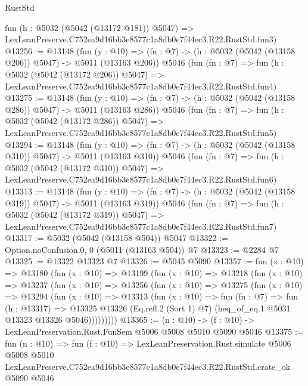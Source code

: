 \begin{lexlean}{RustStd}
\begin{coremodule}
    fun (h : @5032 (@5042 (@13172 @181)) @5047) =>
    LexLeanPreserve.C752ea9d16bb3e8577c1a8db0e7f44ec3.R22.RustStd.fun3)
@13256 := @13148
    (fun (y : @10) => (fn : @7) -> (h : @5032 (@5042 (@13158 @206)) @5047) -> @5011 (@13163 @206))
    @5046
    (fun (fn : @7) =>
    fun (h : @5032 (@5042 (@13172 @206)) @5047) =>
    LexLeanPreserve.C752ea9d16bb3e8577c1a8db0e7f44ec3.R22.RustStd.fun4)
@13275 := @13148
    (fun (y : @10) => (fn : @7) -> (h : @5032 (@5042 (@13158 @286)) @5047) -> @5011 (@13163 @286))
    @5046
    (fun (fn : @7) =>
    fun (h : @5032 (@5042 (@13172 @286)) @5047) =>
    LexLeanPreserve.C752ea9d16bb3e8577c1a8db0e7f44ec3.R22.RustStd.fun5)
@13294 := @13148
    (fun (y : @10) => (fn : @7) -> (h : @5032 (@5042 (@13158 @310)) @5047) -> @5011 (@13163 @310))
    @5046
    (fun (fn : @7) =>
    fun (h : @5032 (@5042 (@13172 @310)) @5047) =>
    LexLeanPreserve.C752ea9d16bb3e8577c1a8db0e7f44ec3.R22.RustStd.fun6)
@13313 := @13148
    (fun (y : @10) => (fn : @7) -> (h : @5032 (@5042 (@13158 @319)) @5047) -> @5011 (@13163 @319))
    @5046
    (fun (fn : @7) =>
    fun (h : @5032 (@5042 (@13172 @319)) @5047) =>
    LexLeanPreserve.C752ea9d16bb3e8577c1a8db0e7f44ec3.R22.RustStd.fun7)
@13317 := @5032 (@5042 (@13158 @504)) @5047
@13322 := Option.noConfusion.{0, 0} (@5011 (@13163 @504)) @7
@13323 := @2284 @7
@13325 := @13322 @13323 @7
@13326 := @5045 @5090
@13357 := fun (x : @10) =>
  @13180
    (fun (x : @10) =>
    @13199
      (fun (x : @10) =>
      @13218
        (fun (x : @10) =>
        @13237
          (fun (x : @10) =>
          @13256
            (fun (x : @10) =>
            @13275
              (fun (x : @10) =>
              @13294
                (fun (x : @10) =>
                @13313
                  (fun (x : @10) =>
                  fun (fn : @7) =>
                  fun (h : @13317) =>
                  @13325
                    @13326
                    (Eq.refl.{2} (Sort 1) @7)
                    (heq_of_eq.{1} @5031 @13323 @13326 @5046)))))))))
@13365 := (n : @10) -> (f : @10) -> LexLeanPreservation.Rust.FunSem @5006 @5008 @5010 @5090 @5046
@13375 := fun (n : @10) =>
  fun (f : @10) =>
  LexLeanPreservation.Rust.simulate
    @5006
    @5008
    @5010
    LexLeanPreserve.C752ea9d16bb3e8577c1a8db0e7f44ec3.R22.RustStd.crate_ok
    @5090
    @5046
\end{coremodule}
\end{lexlean}

